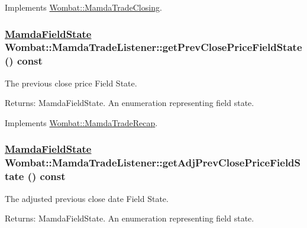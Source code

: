 Implements \hyperlink{classWombat_1_1MamdaTradeClosing_9038a566c4c213c24f304cbd884f2791}{Wombat::Mamda\-Trade\-Closing}.\hypertarget{classWombat_1_1MamdaTradeListener_6b5ce55994a03c95c2a4b0732f75c664}{
\subsubsection[getPrevClosePriceFieldState]{\setlength{\rightskip}{0pt plus 5cm}\hyperlink{namespaceWombat_93aac974f2ab713554fd12a1fa3b7d2a}{Mamda\-Field\-State} Wombat::Mamda\-Trade\-Listener::get\-Prev\-Close\-Price\-Field\-State () const}}
\label{classWombat_1_1MamdaTradeListener_6b5ce55994a03c95c2a4b0732f75c664}


The previous close price Field State. 

\begin{Desc}
\item[Returns:]Mamda\-Field\-State. An enumeration representing field state. \end{Desc}


Implements \hyperlink{classWombat_1_1MamdaTradeRecap_59c935c0a3b018e48fd9b1bb476cd4b7}{Wombat::Mamda\-Trade\-Recap}.\hypertarget{classWombat_1_1MamdaTradeListener_0df7a1c343774b3577b2e28867470ea9}{
\subsubsection[getAdjPrevClosePriceFieldState]{\setlength{\rightskip}{0pt plus 5cm}\hyperlink{namespaceWombat_93aac974f2ab713554fd12a1fa3b7d2a}{Mamda\-Field\-State} Wombat::Mamda\-Trade\-Listener::get\-Adj\-Prev\-Close\-Price\-Field\-State () const}}
\label{classWombat_1_1MamdaTradeListener_0df7a1c343774b3577b2e28867470ea9}


The adjusted previous close date Field State. 

\begin{Desc}
\item[Returns:]Mamda\-Field\-State. An enumeration representing field state. \end{Desc}



